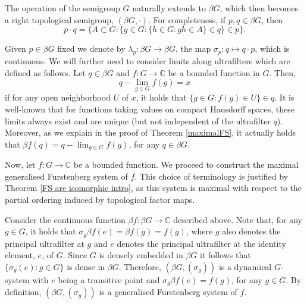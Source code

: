 \documentclass{amsart}
\numberwithin{equation}{section}
\theoremstyle{definition}
\theoremstyle{plain}
\newcommand{\C}{{\mathbb C}}
\begin{document}
The operation of the semigroup $G$ naturally extends to $\beta G$, which
then becomes a right topological semigroup, $(\beta G,\cdot)$. For completeness, if $p,q\in \beta G$, then 
$$p \cdot q=\{A\subset G: \{g\in G: \{h\in G: gh\in A\}\in q\}\in p\}.$$


Given $p\in \beta G$ fixed we denote by $\lambda_p:\beta G\to \beta G$, the 
map $\sigma_p: q\mapsto q\cdot p$, which is continuous. We will further 
need to consider limits along ultrafilters which are defined as follows. Let $q\in \beta G$ and $f: G\to \C$ be a bounded function in $G$. Then, 
$$q-\lim_{g\in G} f(g)=x$$ if for any open neighborhood $U$ of $x$, it 
holds that $\{g\in G: f(g)\in U \}\in q$. It is well-known that for 
functions taking values on compact Hausdorff spaces, these limits 
always exist and are unique (but not independent of the ultrafilter 
$q$). Moreover, as we explain in the proof of Theorem \ref{maximalFS}, it actually holds that $\beta f(q)=q-\lim_{g\in G} f(g)$, for any $q\in \beta G$. 

Now, let $f:G\to \C$ be a bounded function. We proceed to construct 
the maximal generalised Furstenberg system of $f$. This choice of 
terminology is justified by Theorem \ref{FS are isomorphic intro}, as this system is maximal with 
respect to the partial ordering induced by topological factor maps.

Consider the continuous function 
$\beta f: \beta G\to \C$ described above. Note that, for any $g\in G$, it 
holds that $\sigma_g \beta f(e)=\beta f(g)=f(g)$, where $g$ also denotes 
the principal ultrafilter at $g$ and $e$ denotes the principal ultrafilter 
at the identity element, $e$, of $G$. Since $G$ is densely embedded in $\beta G$ it follows that $\{\sigma_g(e): g\in G\}$ is dense in $\beta G$. Therefore, $(\beta G, (\sigma_g))$ is a dynamical $G$-system with $e$ being a transitive point and $\sigma_g \beta f(e)=f(g)$, for any $g\in G$. By definition, $(\beta G, (\sigma_g))$ is a generalised Furstenberg system of $f$. 
\end{document}
